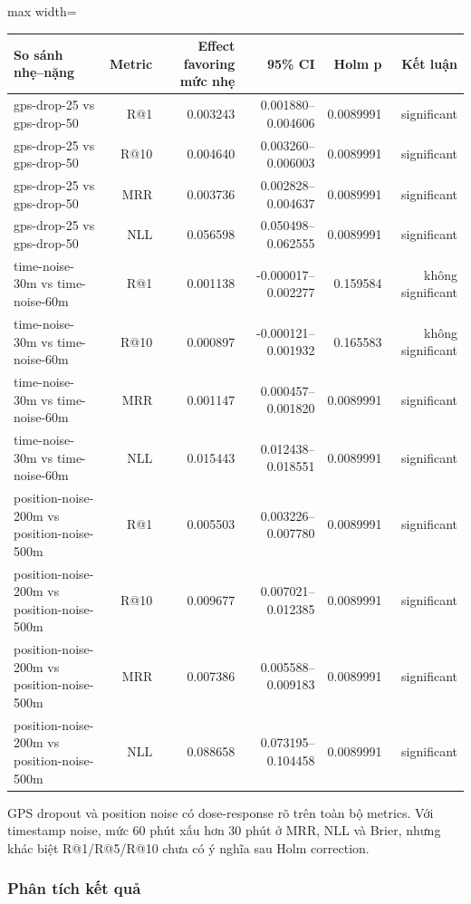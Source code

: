 \begin{table}[!htbp]
\centering
\scriptsize
\setlength{\tabcolsep}{2.5pt}
\begin{adjustbox}{max width=\textwidth}
\begin{tabular}{@{}lrrrrr@{}}
\toprule
So sánh nhẹ--nặng & Metric & Effect favoring mức nhẹ & 95\% CI & Holm p & Kết luận \\
\midrule
gps-drop-25 vs gps-drop-50 & R@1 & 0.003243 & 0.001880--0.004606 & 0.0089991 & significant \\
gps-drop-25 vs gps-drop-50 & R@10 & 0.004640 & 0.003260--0.006003 & 0.0089991 & significant \\
gps-drop-25 vs gps-drop-50 & MRR & 0.003736 & 0.002828--0.004637 & 0.0089991 & significant \\
gps-drop-25 vs gps-drop-50 & NLL & 0.056598 & 0.050498--0.062555 & 0.0089991 & significant \\
time-noise-30m vs time-noise-60m & R@1 & 0.001138 & -0.000017--0.002277 & 0.159584 & không significant \\
time-noise-30m vs time-noise-60m & R@10 & 0.000897 & -0.000121--0.001932 & 0.165583 & không significant \\
time-noise-30m vs time-noise-60m & MRR & 0.001147 & 0.000457--0.001820 & 0.0089991 & significant \\
time-noise-30m vs time-noise-60m & NLL & 0.015443 & 0.012438--0.018551 & 0.0089991 & significant \\
position-noise-200m vs position-noise-500m & R@1 & 0.005503 & 0.003226--0.007780 & 0.0089991 & significant \\
position-noise-200m vs position-noise-500m & R@10 & 0.009677 & 0.007021--0.012385 & 0.0089991 & significant \\
position-noise-200m vs position-noise-500m & MRR & 0.007386 & 0.005588--0.009183 & 0.0089991 & significant \\
position-noise-200m vs position-noise-500m & NLL & 0.088658 & 0.073195--0.104458 & 0.0089991 & significant \\
\bottomrule
\end{tabular}
\end{adjustbox}
\end{table}

GPS dropout và position noise có dose-response rõ trên toàn bộ metrics. Với timestamp noise, mức 60 phút xấu hơn 30 phút ở MRR, NLL và Brier, nhưng khác biệt R@1/R@5/R@10 chưa có ý nghĩa sau Holm correction.

\subsubsection*{Phân tích kết quả}

